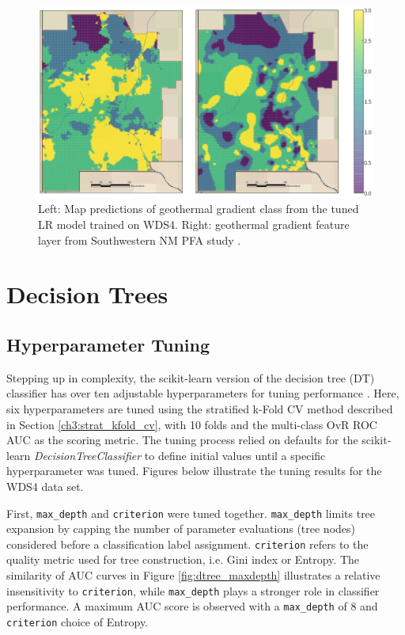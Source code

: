 \begin{figure}[!htp]
\centering
\includegraphics[width=\textwidth]{templates/images/Figure-LR-FinalMap_Joint.png}
\caption[Logistic regression prediction map]{Left: Map predictions of geothermal gradient class from the tuned LR model trained on WDS4. Right: geothermal gradient feature layer from Southwestern NM PFA study \protect\citep{bielicki_hydrogeolgic_2015}.}
\label{fig:logreg_final_map}
\end{figure}

\section{Decision Trees}\label{ch5:dtree_model}
\subsection{Hyperparameter Tuning}\label{ch5:dtree_tuning}
Stepping up in complexity, the scikit-learn version of the decision tree (DT) classifier has over ten adjustable hyperparameters for tuning performance \citep{pedregosa_scikit-learn_2011}. Here, six hyperparameters are tuned using the stratified k-Fold CV method described in Section \ref{ch3:strat_kfold_cv}, with 10 folds and the multi-class OvR ROC AUC as the scoring metric. The tuning process relied on defaults for the scikit-learn \textit{DecisionTreeClassifier} to define initial values until a specific hyperparameter was tuned. Figures below illustrate the tuning results for the WDS4 data set.

First, \verb|max_depth| and \verb|criterion| were tuned together. \verb|max_depth| limits tree expansion by capping the number of parameter evaluations (tree nodes) considered before a classification label assignment. \verb|criterion| refers to the quality metric used for tree construction, i.e. Gini index or Entropy. The similarity of AUC curves in Figure \ref{fig:dtree_maxdepth} illustrates a relative insensitivity to \verb|criterion|, while \verb|max_depth| plays a stronger role in classifier performance. A maximum AUC score is observed with a \verb|max_depth| of 8 and \verb|criterion| choice of Entropy.

